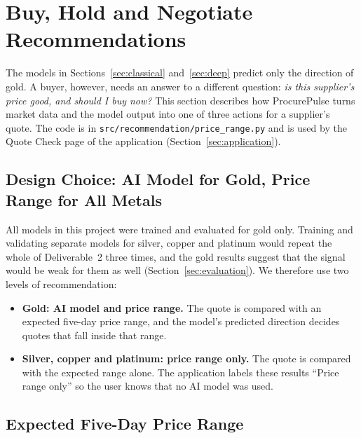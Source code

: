 \section{Buy, Hold and Negotiate Recommendations}
\label{sec:recommendation}

The models in Sections~\ref{sec:classical} and~\ref{sec:deep} predict only the
direction of gold. A buyer, however, needs an answer to a different question:
\emph{is this supplier's price good, and should I buy now?} This section
describes how ProcurePulse turns market data and the model output into one of
three actions for a supplier's quote. The code is in
\texttt{src/recommendation/price\_range.py} and is used by the Quote Check page
of the application (Section~\ref{sec:application}).

\subsection{Design Choice: AI Model for Gold, Price Range for All Metals}

All models in this project were trained and evaluated for gold only. Training
and validating separate models for silver, copper and platinum would repeat
the whole of Deliverable~2 three times, and the gold results suggest that the
signal would be weak for them as well (Section~\ref{sec:evaluation}). We
therefore use two levels of recommendation:

\begin{itemize}
  \item \textbf{Gold: AI model and price range.} The quote is compared with an
        expected five-day price range, and the model's predicted direction
        decides quotes that fall inside that range.
  \item \textbf{Silver, copper and platinum: price range only.} The quote is
        compared with the expected range alone. The application labels these
        results ``Price range only'' so the user knows that no AI model was
        used.
\end{itemize}

\subsection{Expected Five-Day Price Range}

